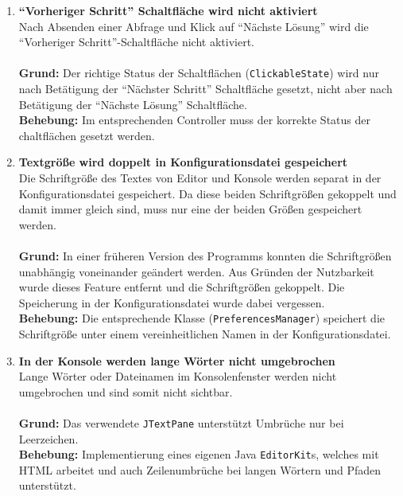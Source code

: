 \documentclass[parskip=full,11pt,twoside]{scrartcl}
\begin{document}
\begin{enumerate}[label=\#\arabic*]
  \item \textbf{\enquote{Vorheriger Schritt} Schaltfläche wird nicht aktiviert}\\
        Nach Absenden einer Abfrage und Klick auf \enquote{Nächste Lösung} wird die \enquote{Vorheriger Schritt}-Schaltfläche nicht aktiviert.\\\\
        \textbf{Grund:} Der richtige Status der Schaltflächen (\texttt{ClickableState}) wird nur nach Betätigung der \enquote{Nächster Schritt} Schaltfläche gesetzt, nicht aber nach Betätigung der \enquote{Nächste Lösung} Schaltfläche.\\
        \textbf{Behebung:} Im entsprechenden Controller muss der korrekte Status der chaltflächen gesetzt werden.

  \item \textbf{Textgröße wird doppelt in Konfigurationsdatei gespeichert}\\
        Die Schriftgröße des Textes von Editor und Konsole werden separat in der Konfigurationsdatei gespeichert. Da diese beiden Schriftgrößen gekoppelt und damit immer gleich sind, muss nur eine der beiden Größen gespeichert werden.\\\\
        \textbf{Grund:} In einer früheren Version des Programms konnten die Schriftgrößen unabhängig voneinander geändert werden. Aus Gründen der Nutzbarkeit wurde dieses Feature entfernt und die Schriftgrößen gekoppelt. Die Speicherung in der Konfigurationsdatei wurde dabei vergessen.\\
        \textbf{Behebung:} Die entsprechende Klasse (\texttt{PreferencesManager}) speichert die Schriftgröße unter einem vereinheitlichen Namen in der Konfigurationsdatei.

  \item \textbf{In der Konsole werden lange Wörter nicht umgebrochen}\\
        Lange Wörter oder Dateinamen im Konsolenfenster werden nicht umgebrochen und sind somit nicht sichtbar.\\\\
        \textbf{Grund:} Das verwendete \texttt{JTextPane} unterstützt Umbrüche nur bei Leerzeichen.\\
        \textbf{Behebung:} Implementierung eines eigenen Java \texttt{EditorKit}s, welches mit HTML arbeitet und auch Zeilenumbrüche bei langen Wörtern und Pfaden unterstützt.


\end{enumerate}
\end{document}
